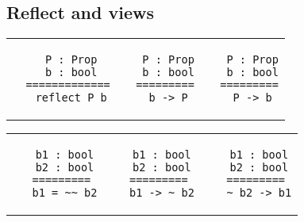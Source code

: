 \begin{landscape}
\begin{small}
\begin{multicols*}{3}[\begin{center}\section*{}\end{center}]

\subsection*{Reflect and views}


  \begin{tabular}{c@{$\to$}cc}
  \begin{minipage}{0.12\textwidth}\begin{lstlisting}
   P : Prop
   b : bool
  =============
   reflect P b
  \end{lstlisting}\end{minipage}
  &
  \begin{minipage}{0.10\textwidth}\begin{lstlisting}
   P : Prop
   b : bool
  =========
   b -> P
  \end{lstlisting}\end{minipage}
  &
  \begin{minipage}{0.10\textwidth}\begin{lstlisting}
   P : Prop
   b : bool
  =========
   P -> b
  \end{lstlisting}\end{minipage}
  \end{tabular}


  \begin{tabular}{c@{$\to$}cc} 
  \begin{minipage}{0.10\textwidth}\begin{lstlisting}
   b1 : bool
   b2 : bool
  =========
   b1 = ~~ b2
  \end{lstlisting}\end{minipage}
  &
  \begin{minipage}{0.10\textwidth}\begin{lstlisting}
   b1 : bool
   b2 : bool
  =========
   b1 -> ~ b2
  \end{lstlisting}\end{minipage}
  &
  \begin{minipage}{0.10\textwidth}\begin{lstlisting}
   b1 : bool
   b2 : bool
  =========
   ~ b2 -> b1
  \end{lstlisting}\end{minipage}
  \end{tabular}


\end{multicols*}
\end{small}
\end{landscape}
